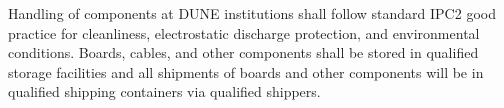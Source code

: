 Handling of  components at DUNE institutions shall follow standard IPC2 good practice for cleanliness, electrostatic discharge protection, and environmental conditions. Boards, cables, and other  components shall be stored in qualified storage facilities and all shipments of boards and other components will be in qualified shipping containers via qualified shippers.
